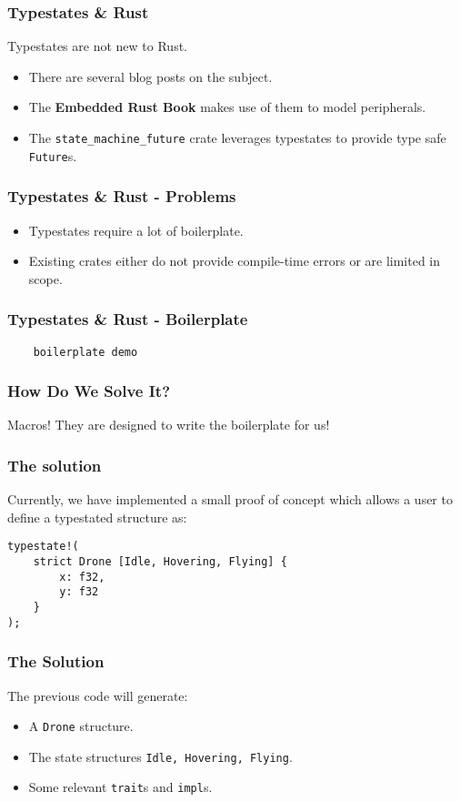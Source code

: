 \documentclass{beamer}
\begin{document}
\begin{frame}
    \frametitle{Typestates \& Rust}

    Typestates are not new to Rust.
    \begin{itemize}
        \item There are several blog posts on the subject.
        \item The \textbf{Embedded Rust Book} makes use of them to model peripherals.
        \item The \texttt{state\_machine\_future} crate leverages typestates to provide type safe \texttt{Future}s.
    \end{itemize}
\end{frame}

\begin{frame}
    \frametitle{Typestates \& Rust - Problems}

    \begin{itemize}
        \item Typestates require a lot of boilerplate.
        \item Existing crates either do not provide compile-time errors or are limited in scope.
    \end{itemize}
\end{frame}

\begin{frame}[fragile]
    \frametitle{Typestates \& Rust - Boilerplate}

    \begin{lstlisting}
    boilerplate demo
    \end{lstlisting}
\end{frame}

\begin{frame}[fragile]
    \frametitle{How Do We Solve It?}
    Macros! They are designed to write the boilerplate for us!
\end{frame}

\begin{frame}[fragile]
    \frametitle{The solution}
    Currently, we have implemented a small proof of concept which allows a user to define a typestated structure as:
    \begin{lstlisting}
typestate!(
    strict Drone [Idle, Hovering, Flying] {
        x: f32,
        y: f32
    }
);
    \end{lstlisting}
\end{frame}

\begin{frame}[fragile]
    \frametitle{The Solution}
    The previous code will generate:
    \begin{itemize}
        \item A \texttt{Drone} structure.
        \item The state structures \texttt{Idle, Hovering, Flying}.
        \item Some relevant \texttt{trait}s and \texttt{impl}s.
    \end{itemize}
\end{frame}
\end{document}
